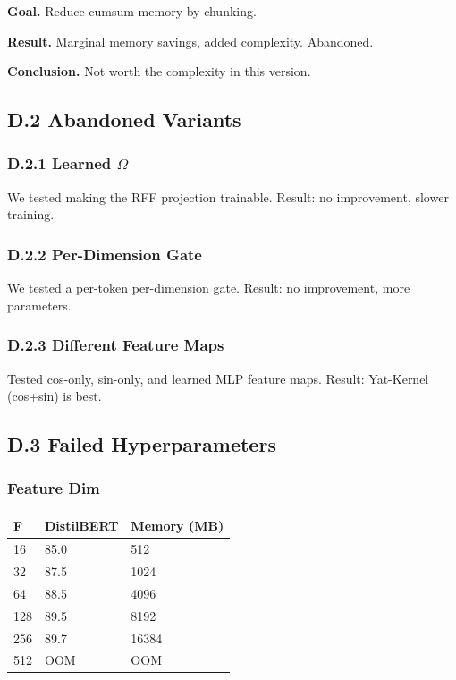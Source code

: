 \textbf{Goal.} Reduce cumsum memory by chunking.

\textbf{Result.} Marginal memory savings, added complexity. Abandoned.

\textbf{Conclusion.} Not worth the complexity in this version.

\subsection{D.2 Abandoned Variants}

\subsubsection{D.2.1 Learned $\Omega$}

We tested making the RFF projection trainable. Result: no improvement, 
slower training.

\subsubsection{D.2.2 Per-Dimension Gate}

We tested a per-token per-dimension gate. Result: no improvement, more 
parameters.

\subsubsection{D.2.3 Different Feature Maps}

Tested cos-only, sin-only, and learned MLP feature maps. Result: 
Yat-Kernel (cos+sin) is best.

\subsection{D.3 Failed Hyperparameters}

\subsubsection{Feature Dim}

\begin{table}[H]
\centering
\small
\begin{tabular}{lll}
\toprule
\textbf{F} & \textbf{DistilBERT} & \textbf{Memory (MB)} \\
\midrule
16 & 85.0 & 512 \\
32 & 87.5 & 1024 \\
64 & 88.5 & 4096 \\
128 & 89.5 & 8192 \\
256 & 89.7 & 16384 \\
512 & OOM & OOM \\
\bottomrule
\end{tabular}
\end{table}

